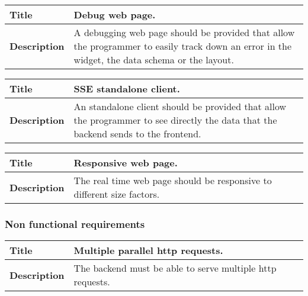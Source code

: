 \documentclass[12pt]{article}
\begin{document}
                \begin{tabularx}{\textwidth}{|l|X|}
                    \hline
                    \textbf{Title} & Debug web page. \\
                    \hline
                    \textbf{Description} & A debugging web page should be
                    provided that allow the programmer to easily track down an
                    error in the widget, the data schema or the layout. \\
                    \hline
                \end{tabularx}

                \begin{tabularx}{\textwidth}{|l|X|}
                    \hline
                    \textbf{Title} & SSE standalone client. \\
                    \hline
                    \textbf{Description} & An standalone client should be
                    provided that allow the programmer to see directly the data
                    that the backend sends to the frontend. \\
                    \hline
                \end{tabularx}

                \begin{tabularx}{\textwidth}{|l|X|}
                    \hline
                    \textbf{Title} & Responsive web page. \\
                    \hline
                    \textbf{Description} & The real time web page should be
                    responsive to different size factors. \\
                    \hline
                \end{tabularx}

            \subsubsection{Non functional requirements}
                \begin{tabularx}{\textwidth}{|l|X|}
                    \hline
                    \textbf{Title} & Multiple parallel http requests. \\
                    \hline
                    \textbf{Description} & The backend must be able to serve
                    multiple http requests. \\
                    \hline
                \end{tabularx}
\end{document}
